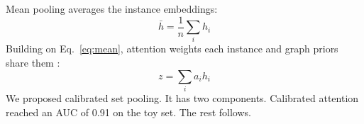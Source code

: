 \documentclass{article}
\begin{document}
Mean pooling averages the instance embeddings:
\begin{equation}
\bar h = \frac{1}{n}\sum_i h_i \label{eq:mean}
\end{equation}
Building on Eq.~\eqref{eq:mean}, attention weights each instance \cite{alpha2024} and graph priors share them \citep{beta2023}:
\begin{equation}
z = \sum_i a_i h_i \label{eq:calibrated}
\end{equation}
We proposed calibrated set pooling. It has two components.
Calibrated attention reached an AUC of 0.91 on the toy set. The rest follows.

\end{document}
